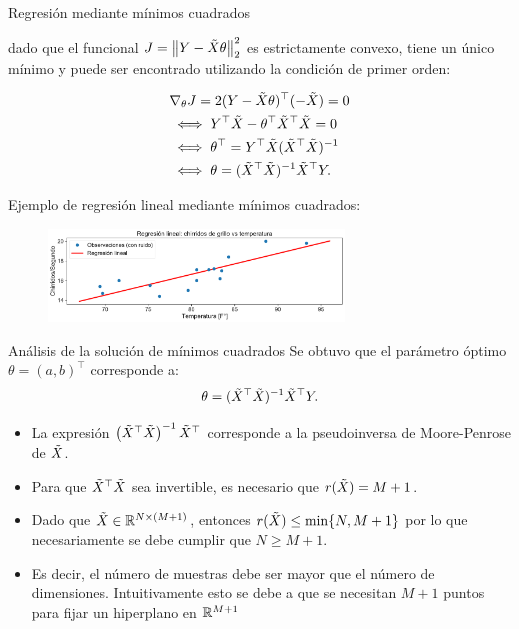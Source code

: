\documentclass[handout, 9pt]{beamer}
\begin{document}
\begin{frame}{Regresión mediante mínimos cuadrados}

dado que el funcional $J=\left\lVert Y-\tilde{X}\theta\right\rVert_2^2$ es estrictamente convexo, tiene un único mínimo y puede ser encontrado utilizando la condición de primer orden:

\begin{align*}
	&\nabla_\theta J= 2(Y-\tilde{X}\theta)^\top(-\tilde{X})=0\nonumber \\
	& \iff Y^\top\tilde{X} -\theta^\top\tilde{X}^\top\tilde{X} = 0\nonumber\\
	& \iff \theta^\top = Y^\top \tilde{X}(\tilde{X}^\top\tilde{X})^{-1}\nonumber\\
	& \iff \theta = (\tilde{X}^\top\tilde{X})^{-1}\tilde{X}^\top Y. \label{eq:sol_mse}
\end{align*}

\pause

Ejemplo de regresión lineal mediante mínimos cuadrados:
\begin{figure}[h]
	\centering
	\includegraphics[width=0.7\textwidth]{../img/cap2_chirridos.pdf}\\
\end{figure}
	
\end{frame}

\begin{frame}{Análisis de la solución de mínimos cuadrados}
Se obtuvo que el parámetro óptimo $\theta=(a,b)^\top$ corresponde a:
\begin{equation*}
	\theta = (\tilde{X}^\top\tilde{X})^{-1}\tilde{X}^\top Y.
\end{equation*}\pause

\begin{itemize}
	\item La expresión $\left(\tilde{X}^\top\tilde{X} \right)^{-1} \tilde{X}^\top$ corresponde a la pseudoinversa de Moore-Penrose de $\tilde{X}$.\pause
	\item Para que $\tilde{X}^\top\tilde{X}$ sea invertible, es necesario que $r(\tilde{X})=M+1$.\pause
	\item Dado que $\tilde{X}\in\mathbb{R}^{N\times (M+1)}$, entonces $r(\tilde{X})\leq\min\{N,M+1\}$ por lo que necesariamente se debe cumplir que $N\geq M+1$.\pause
	\item Es decir, el número de muestras debe ser mayor que el número de dimensiones. Intuitivamente esto se debe a que se necesitan $M+1$ puntos para fijar un hiperplano en $\mathbb{R}^{M+1}$
\end{itemize}
	
\end{frame}
\end{document}
